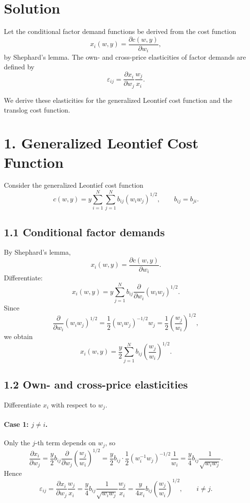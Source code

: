 \section*{Solution}

Let the conditional factor demand functions be derived from the cost function
\[
x_i(w,y)=\frac{\partial c(w,y)}{\partial w_i},
\]
by Shephard's lemma. The own- and cross-price elasticities of factor demands are defined by
\[
\varepsilon_{ij}
=
\frac{\partial x_i}{\partial w_j}\frac{w_j}{x_i}.
\]

We derive these elasticities for the generalized Leontief cost function and the translog cost function.

\bigskip
\section*{1. Generalized Leontief Cost Function}

Consider the generalized Leontief cost function
\[
c(w,y)
=
y\sum_{i=1}^N\sum_{j=1}^N b_{ij}(w_i w_j)^{1/2},
\qquad b_{ij}=b_{ji}.
\]

\subsection*{1.1 Conditional factor demands}

By Shephard's lemma,
\[
x_i(w,y)=\frac{\partial c(w,y)}{\partial w_i}.
\]
Differentiate:
\[
x_i(w,y)
=
y\sum_{j=1}^N b_{ij}\frac{\partial}{\partial w_i}(w_i w_j)^{1/2}.
\]
Since
\[
\frac{\partial}{\partial w_i}(w_i w_j)^{1/2}
=
\frac{1}{2}(w_i w_j)^{-1/2}w_j
=
\frac{1}{2}\left(\frac{w_j}{w_i}\right)^{1/2},
\]
we obtain
\[
\boxed{
x_i(w,y)
=
\frac{y}{2}\sum_{j=1}^N b_{ij}\left(\frac{w_j}{w_i}\right)^{1/2}.
}
\]

\subsection*{1.2 Own- and cross-price elasticities}

Differentiate \(x_i\) with respect to \(w_j\).

\paragraph{Case 1: \(j\neq i\).}
Only the \(j\)-th term depends on \(w_j\), so
\[
\frac{\partial x_i}{\partial w_j}
=
\frac{y}{2}b_{ij}\frac{\partial}{\partial w_j}\left(\frac{w_j}{w_i}\right)^{1/2}
=
\frac{y}{2}b_{ij}\cdot \frac{1}{2}(w_i^{-1}w_j)^{-1/2}\frac{1}{w_i}
=
\frac{y}{4}b_{ij}\frac{1}{\sqrt{w_i w_j}}.
\]
Hence
\[
\boxed{
\varepsilon_{ij}
=
\frac{\partial x_i}{\partial w_j}\frac{w_j}{x_i}
=
\frac{y}{4}b_{ij}\frac{1}{\sqrt{w_i w_j}}\frac{w_j}{x_i}
=
\frac{y}{4x_i}b_{ij}\left(\frac{w_j}{w_i}\right)^{1/2},
\qquad i\neq j.
}
\]

